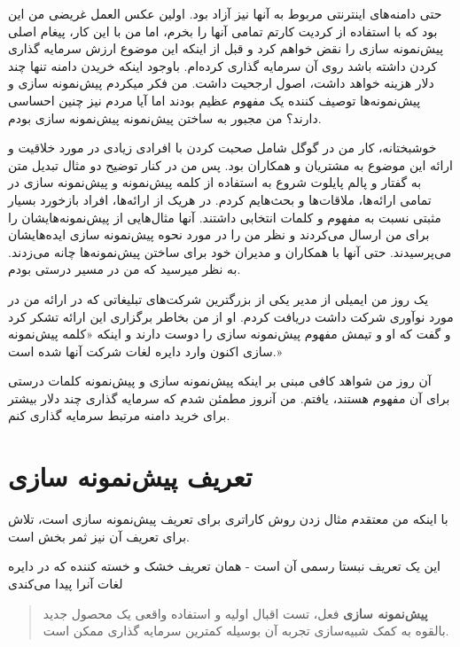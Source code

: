 حتی دامنه‌های اینترنتی مربوط به آنها نیز آزاد بود. اولین عکس العمل غریضی
من این بود که با استفاده از کردیت کارتم تمامی آنها را بخرم، اما من با
این کار، پیغام اصلی پیش‌نمونه سازی را نقض خواهم کرد و قبل از اینکه این
موضوع ارزش سرمایه گذاری کردن داشته باشد روی آن سرمایه گذاری کرده‌ام.
باوجود اینکه خریدن دامنه تنها چند دلار هزینه خواهد داشت، اصول ارجحیت
داشت. من فکر میکردم پیش‌نمونه سازی و پیش‌نمونه‌ها توصیف کننده یک مفهوم
عظیم بودند اما آیا مردم نیز چنین احساسی دارند؟ من مجبور به ساختن
پیش‌نمونه پیش‌نمونه سازی بودم.

خوشبختانه، کار من در گوگل شامل صحبت کردن با افرادی زیادی در مورد خلاقیت
و ارائه این موضوع به مشتریان و همکاران بود. پس من در کنار توضیح دو مثال
تبدیل متن به گفتار و پالم پایلوت شروع به استفاده از کلمه پیش‌نمونه و
پیش‌نمونه سازی در تمامی ارائه‌ها، ملاقات‌ها و بحث‌هایم کردم. در هریک از
ارائه‌ها، افراد بازخورد بسیار مثبتی نسبت به مفهوم و کلمات انتخابی
داشتند. آنها مثال‌هایی از پیش‌نمونه‌هایشان را برای من ارسال می‌کردند و
نظر من را در مورد نحوه پیش‌نمونه سازی ایده‌هایشان می‌پرسیدند. حتی آنها
با همکاران و مدیران خود برای ساختن پیش‌نمونه‌ها چانه می‌زدند. به نظر
میرسید که من در مسیر درستی بودم.

یک روز من ایمیلی از مدیر یکی از بزرگترین شرکت‌های تبلیغاتی که در ارائه
من در مورد نوآوری شرکت داشت دریافت کردم. او از من بخاطر برگزاری این
ارائه تشکر کرد و گفت که او و تیمش مفهوم پیش‌نمونه سازی را دوست دارند و
اینکه «کلمه پیش‌نمونه سازی اکنون وارد دایره لغات شرکت آنها شده است.»

آن روز من شواهد کافی مبنی بر اینکه پیش‌نمونه سازی و پیش‌نمونه کلمات
درستی برای آن مفهوم هستند، یافتم. من آنروز مطمئن شدم که سرمایه گذاری چند
دلار بیشتر برای خرید دامنه مرتبط سرمایه گذاری کنم.

\section{تعریف پیش‌نمونه
سازی}\label{ux62aux639ux631ux6ccux641-ux67eux6ccux634ux646ux645ux648ux646ux647-ux633ux627ux632ux6cc}

با اینکه من معتقدم مثال زدن روش‌ کاراتری برای تعریف پیش‌نمونه سازی است،
تلاش برای تعریف آن نیز ثمر بخش است.

این یک تعریف نبستا رسمی آن است - همان تعریف خشک و خسته کننده که در دایره
لغات آنرا پیدا می‌کندی

\begin{quote}
\textbf{پیش‌نمونه سازی} فعل، تست اقبال اولیه و استفاده واقعی یک محصول
جدید بالقوه به کمک شبیه‌سازی تجربه آن بوسیله کمترین سرمایه گذاری ممکن
است.
\end{quote}

